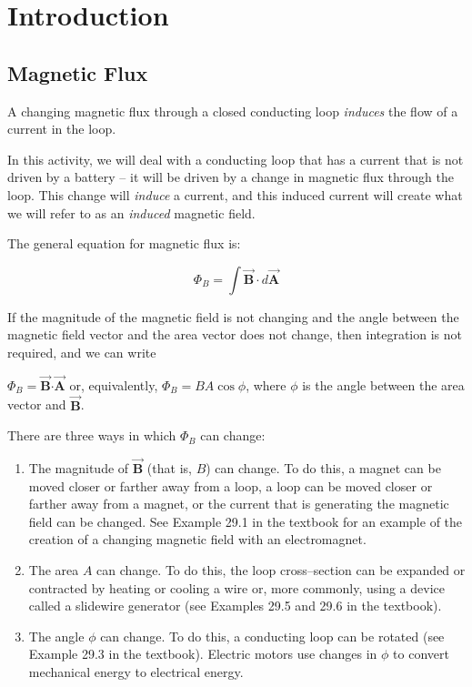 \documentclass{article}
\newcommand{\bfvec}[1]{\vec{\mathbf{#1}}}
\newcommand{\bfcdot}[0]{\boldsymbol{\cdot}}
\begin{document}
\section{Introduction}

\subsection{Magnetic Flux}

A changing magnetic flux through a closed conducting loop \emph{induces} the flow of a current in the loop.

In this activity, we will deal with a conducting loop that has a current that is not driven by a battery -- it will be driven by a change in magnetic flux through the loop. This change will \emph{induce} a current, and this induced current will create what we will refer to as an \emph{induced} magnetic field.

The general equation for magnetic flux is:

$$
\Phi_B = \int \bfvec{B}\cdot d\bfvec{A}
$$

If the magnitude of the magnetic field is not changing and the angle between the magnetic field vector and the area vector does not change, then integration is not required, and we can write

$
\Phi_B = \bfvec{B}\bfcdot \bfvec{A}
$
or, equivalently, $\Phi_B = BA\cos\phi$, where $\phi$ is the angle between the area vector and $\bfvec{B}$.

There are three ways in which $\Phi_B$ can change:

\begin{enumerate}

  \item The magnitude of $\bfvec{B}$ (that is, $B$) can change. To do this, a magnet can be moved closer or farther away from a loop, a loop can be moved closer or farther away from a magnet, or the current that is generating the magnetic field can be changed. See Example 29.1 in the textbook for an example of the creation of a changing magnetic field with an electromagnet.

  \item The area $A$ can change. To do this, the loop cross--section can be expanded or contracted by heating or cooling a wire or, more commonly, using a device called a slidewire generator (see Examples 29.5 and 29.6 in the textbook).

  \item The angle $\phi$ can change. To do this, a conducting loop can be rotated (see Example 29.3 in the textbook). Electric motors use changes in $\phi$ to convert mechanical energy to electrical energy.

\end{enumerate}
\end{document}
